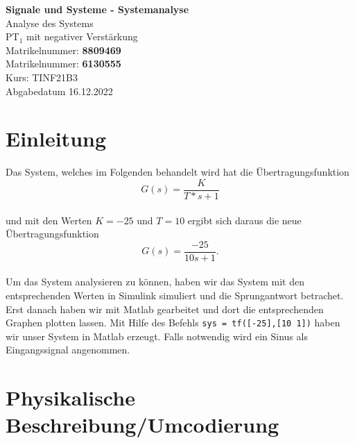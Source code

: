 \documentclass[
  ngerman
  ,12pt
  ,pdftex
]{article}
\begin{document}
\begin{titlepage}
  \begin{center}
      {\Huge \textbf{Signale und Systeme - Systemanalyse}}\\[1.5cm]
      {\Large Analyse des Systems}\\[1cm]
      {\Huge PT$_{1}$ mit negativer Verstärkung}\\[7cm]
      {\large Matrikelnummer: \textbf{8809469}}\\[0.5cm]
      {\large Matrikelnummer: \textbf{6130555}}\\[0.5cm]
      {\large Kurs: TINF21B3}\\[0.5cm]
      {\large Abgabedatum 16.12.2022}
      \vfill
  \end{center}
\end{titlepage}
\newpage
\tableofcontents
\newpage

\section{Einleitung}
Das System, welches im Folgenden behandelt wird hat die Übertragungsfunktion
\begin{equation*}
  G(s)=\frac{K}{T*s+1}
\end{equation*}\\
und mit den Werten $K=-25$ und $T=10$ ergibt sich daraus die neue Übertragungsfunktion
\begin{equation*}
  G(s)=\frac{-25}{10s+1} .
\end{equation*}\\
Um das System analysieren zu können, haben wir das System mit den entsprechenden Werten in Simulink simuliert und die Sprungantwort betrachet.\\
Erst danach haben wir mit Matlab gearbeitet und dort die entsprechenden Graphen plotten lassen. Mit Hilfe des Befehls \texttt{sys = tf([-25],[10 1])} haben wir unser System in Matlab erzeugt. Falls notwendig wird ein Sinus als Eingangssignal angenommen. %



\section{Physikalische Beschreibung/Umcodierung}
\end{document}
